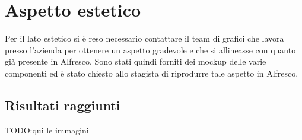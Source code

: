 \section{Aspetto estetico}
Per il lato estetico si è reso necessario contattare il team di grafici che lavora presso l'azienda per ottenere un aspetto gradevole e che si allineasse con quanto già presente in Alfresco. Sono stati quindi forniti dei mockup delle varie componenti ed è stato chiesto allo stagista di riprodurre tale aspetto in Alfresco.
\subsection{Risultati raggiunti}
TODO:qui le immagini